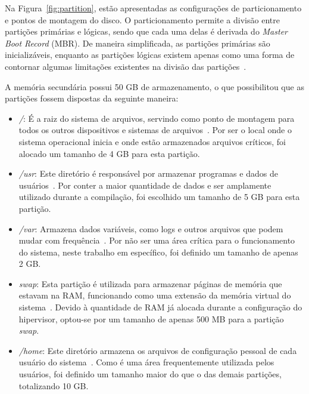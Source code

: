 \documentclass[
	12pt,				%
	oneside,   	        %
	a4paper,			%
	english,			%
	french,				%
	spanish,			%
	brazil,				%
	]{pacotes/abntex2}
\begin{document}
Na Figura~\ref{fig:partition}, estão apresentadas as configurações de particionamento e pontos de montagem do disco. O particionamento permite a divisão entre partições primárias e lógicas, sendo que cada uma delas é derivada do \textit{Master Boot Record} (MBR). De maneira simplificada, as partições primárias são inicializáveis, enquanto as partições lógicas existem apenas como uma forma de contornar algumas limitações existentes na divisão das partições~\cite{archPartition}.

A memória secundária possui 50 GB de armazenamento, o que possibilitou que as partições fossem dispostas da seguinte maneira:

\begin{itemize}
    \item \textit{/}: É a raiz do sistema de arquivos, servindo como ponto de montagem para todos os outros dispositivos e sistemas de arquivos~\cite{tldpRootDir}. Por ser o local onde o sistema operacional inicia e onde estão armazenados arquivos críticos, foi alocado um tamanho de 4 GB para esta partição.
    
    \item \textit{/usr}: Este diretório é responsável por armazenar programas e dados de usuários~\cite{tldpUsrDir}. Por conter a maior quantidade de dados e ser amplamente utilizado durante a compilação, foi escolhido um tamanho de 5 GB para esta partição.
    
    \item \textit{/var}: Armazena dados variáveis, como logs e outros arquivos que podem mudar com frequência~\cite{tldpVarDir}. Por não ser uma área crítica para o funcionamento do sistema, neste trabalho em específico, foi definido um tamanho de apenas 2 GB.
    
    \item \textit{swap}: Esta partição é utilizada para armazenar páginas de memória que estavam na RAM, funcionando como uma extensão da memória virtual do sistema~\cite{archSwap}. Devido à quantidade de RAM já alocada durante a configuração do hipervisor, optou-se por um tamanho de apenas 500 MB para a partição \textit{swap}.
    
    \item \textit{/home}: Este diretório armazena os arquivos de configuração pessoal de cada usuário do sistema~\cite{tldpHomeDir}. Como é uma área frequentemente utilizada pelos usuários, foi definido um tamanho maior do que o das demais partições, totalizando 10 GB.
\end{itemize}
\end{document}
